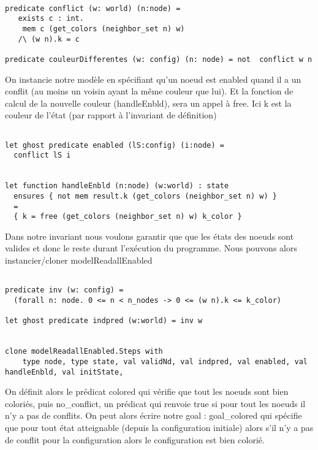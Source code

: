 \documentclass[11pt]{article}
\begin{document}
\lstset{language=why3,label= ,caption= ,captionpos=b,numbers=none}
\begin{lstlisting}

predicate conflict (w: world) (n:node) =
   exists c : int.
    mem c (get_colors (neighbor_set n) w)
   /\ (w n).k = c

predicate couleurDifferentes (w: config) (n: node) = not  conflict w n

\end{lstlisting}

On instancie notre modèle en spécifiant qu'un noeud est enabled quand il a un conflit (au moins un voisin ayant la même couleur que lui).
Et la fonction de calcul de la nouvelle couleur (handleEnbld), sera un appel à free. 
Ici  k est la couleur de l'état (par rapport à l'invariant de définition)

\lstset{language=why3,label= ,caption= ,captionpos=b,numbers=none}
\begin{lstlisting}

let ghost predicate enabled (lS:config) (i:node) =
  conflict lS i


let function handleEnbld (n:node) (w:world) : state
  ensures { not mem result.k (get_colors (neighbor_set n) w) }
  =
  { k = free (get_colors (neighbor_set n) w) k_color }

\end{lstlisting}

Dans notre invariant nous voulons garantir que que les états des noeuds sont valides et donc le reste durant l'exécution du programme.
Nous pouvons alors instancier/cloner modelReadallEnabled

\lstset{language=why3,label= ,caption= ,captionpos=b,numbers=none}
\begin{lstlisting}

predicate inv (w: config) =
  (forall n: node. 0 <= n < n_nodes -> 0 <= (w n).k <= k_color)

let ghost predicate indpred (w:world) = inv w


clone modelReadallEnabled.Steps with
    type node, type state, val validNd, val indpred, val enabled, val handleEnbld, val initState,

\end{lstlisting}

On définit alors le prédicat colored qui vérifie que tout les noeuds sont bien coloriés, 
puis no\_conflict, un prédicat qui renvoie true si pour tout les noeuds il n'y a pas de conflits.
On peut alors écrire notre goal : goal\_colored qui spécifie que pour tout état atteignable (depuis 
la configuration initiale) alors s'il n'y a pas de conflit pour la configuration alors le configuration 
est bien colorié. 
\end{document}
